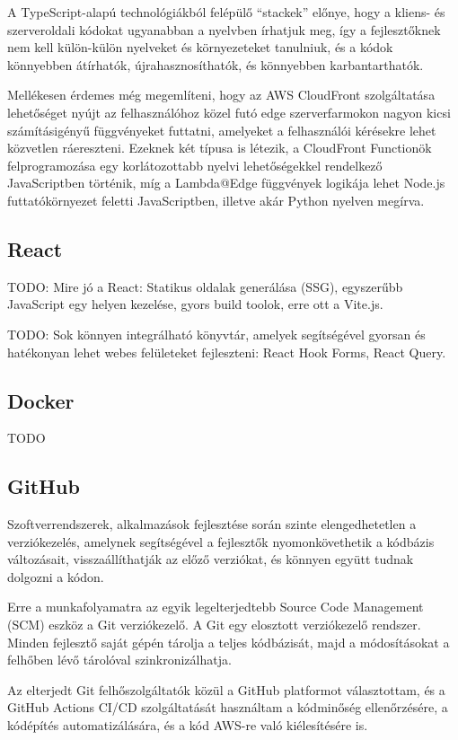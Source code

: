 A TypeScript-alapú technológiákból felépülő ``stackek'' előnye, hogy a kliens- és szerveroldali kódokat ugyanabban a nyelvben írhatjuk meg, így a fejlesztőknek nem kell külön-külön nyelveket és környezeteket tanulniuk, és a kódok könnyebben átírhatók, újrahasznosíthatók, és könnyebben karbantarthatók.

Mellékesen érdemes még megemlíteni, hogy az AWS CloudFront szolgáltatása lehetőséget nyújt az felhasználóhoz közel futó edge szerverfarmokon nagyon kicsi számításigényű függvényeket futtatni, amelyeket a felhasználói kérésekre lehet közvetlen ráereszteni. Ezeknek két típusa is létezik, a CloudFront Functionök felprogramozása egy korlátozottabb nyelvi lehetőségekkel rendelkező JavaScriptben történik, míg a Lambda@Edge függvények logikája lehet Node.js futtatókörnyezet feletti JavaScriptben, illetve akár Python nyelven megírva.

\subsection{React}

TODO: Mire jó a React: Statikus oldalak generálása (SSG), egyszerűbb JavaScript egy helyen kezelése, gyors build toolok, erre ott a Vite.js.

TODO: Sok könnyen integrálható könyvtár, amelyek segítségével gyorsan és hatékonyan lehet webes felületeket fejleszteni: React Hook Forms, React Query.

\subsection{Docker}

TODO

\subsection{GitHub}

Szoftverrendszerek, alkalmazások fejlesztése során szinte elengedhetetlen a verziókezelés, amelynek segítségével a fejlesztők nyomonkövethetik a kódbázis változásait, visszaállíthatják az előző verziókat, és könnyen együtt tudnak dolgozni a kódon.

Erre a munkafolyamatra az egyik legelterjedtebb Source Code Management (SCM) eszköz a Git verziókezelő. A Git egy elosztott verziókezelő rendszer. Minden fejlesztő saját gépén tárolja a teljes kódbázisát, majd a módosításokat a felhőben lévő tárolóval szinkronizálhatja.

Az elterjedt Git felhőszolgáltatók közül a GitHub platformot választottam, és a GitHub Actions CI/CD szolgáltatását használtam a kódminőség ellenőrzésére, a kódépítés automatizálására, és a kód AWS-re való kiélesítésére is.
